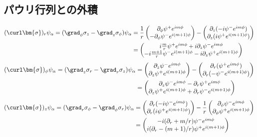 \documentclass[a4paper,11pt,uplatex]{jsarticle}%
\begin{document}
\subsection*{パウリ行列との外積}
\begin{align}
  (\curl\bm{\sigma})_r\psi_{\alpha} = (\grad_{\phi}\sigma_z - \grad_{z}\sigma_{\phi})\psi_{\alpha}
   & = \frac{1}{r}
  \begin{pmatrix}
    \partial_{\phi}\psi^{+}e^{im\phi} \\
    -\partial_{\phi}\psi^{-}e^{i(m+1)\phi}
  \end{pmatrix}
  -\begin{pmatrix}
     \partial_{z}(-i\psi^{-}e^{im\phi}) \\
     \partial_{z}(i\psi^{+}e^{i(m+1)\phi})
   \end{pmatrix} \\
   & =
  \begin{pmatrix}
    i\frac{m}{r}\psi^{+}e^{im\phi}  + i\partial_z \psi^{-}e^{im\phi} \\
    -i\frac{m+1}{r}\psi^{-}e^{i(m+1)\phi} - i\partial_z \psi^{+}e^{i(m+1)\phi}
  \end{pmatrix}
\end{align}
\begin{align}
  (\curl\bm{\sigma})_{\phi}\psi_{\alpha} = (\grad_{z}\sigma_r - \grad_{r}\sigma_{z})\psi_{\alpha}
   & =
  \begin{pmatrix}
    \partial_{z}\psi^{-}e^{im\phi} \\
    \partial_{z}\psi^{+}e^{i(m+1)\phi}
  \end{pmatrix}
  -\begin{pmatrix}
     \partial_{r}(\psi^{+}e^{im\phi}) \\
     \partial_{r}(-\psi^{-}e^{i(m+1)\phi})
   \end{pmatrix} \\
   & =
  \begin{pmatrix}
    \partial_z \psi^{-}e^{im\phi} - \partial_r \psi^{+}e^{im\phi} \\
    \partial_z \psi^{+}e^{i(m+1)\phi} + \partial_r \psi^{-}e^{i(m+1)\phi}
  \end{pmatrix}
\end{align}
\begin{align}
  (\curl\bm{\sigma})_{z}\psi_{\alpha} = (\grad_{r}\sigma_{\phi} - \grad_{\phi}\sigma_{r})\psi_{\alpha}
   & =
  \begin{pmatrix}
    \partial_{r}(-i\psi^{-}e^{im\phi}) \\
    \partial_{r}(i\psi^{+}e^{i(m+1)\phi})
  \end{pmatrix}
  -\frac{1}{r}
  \begin{pmatrix}
    \partial_{\phi}\psi^{-}e^{im\phi} \\
    \partial_{\phi}\psi^{+}e^{i(m+1)\phi}
  \end{pmatrix} \\
   & =
  \begin{pmatrix}
    -i(\partial_r + m/r)\psi^{-}e^{im\phi} \\
    i(\partial_r - (m+1)/r)\psi^{+}e^{i(m+1)\phi}
  \end{pmatrix}
\end{align}
\end{document}
